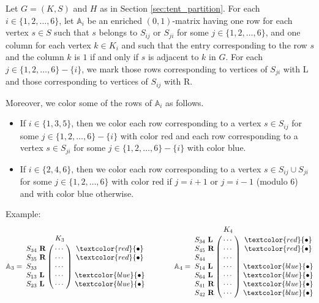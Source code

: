 \documentclass[12pt]{book}
\theoremstyle{plain}
\theoremstyle{remark}
\begin{document}
Let $G=(K,S)$ and $H$ as in Section \ref{sec:tent_partition}. 
For each $i\in\{1,2,\ldots,6\}$, let $\mathbb A_i$ be an enriched $(0,1)$-matrix having one row for each vertex $s\in S$ such that $s$ belongs to $S_{ij}$ or $S_{ji}$ for some $j\in\{1,2,\ldots,6\}$, and one column for each vertex $k\in K_i$ and such that the entry corresponding to the row $s$ and the column $k$ is $1$ if and only if $s$ is adjacent to $k$ in $G$. For each $j\in\{1,2,\ldots,6\}-\{i\}$, we mark those rows corresponding to vertices of $S_{ji}$ with L and those corresponding to vertices of $S_{ij}$ with R.

Moreover, we color some of the rows of $\mathbb A_i$ as follows.
\begin{itemize}
 \item If $i\in\{1,3,5\}$, then we color each row corresponding to a vertex $s\in S_{ij}$ for some $j\in\{1,2,\ldots,6\}-\{i\}$ with color red and each row corresponding to a vertex $s\in S_{ji}$ for some $j\in\{1,2,\ldots,6\}-\{i\}$ with color blue.
 \item If $i\in\{2,4,6\}$, then we color each row corresponding to a vertex $s\in S_{ij}\cup S_{ji}$ for some $j\in\{1,2,\ldots,6\}$ with color red if $j=i+1$ or $j=i-1$ (modulo $6$) and with color blue otherwise.
\end{itemize}

Example:
\[ \mathbb A_3 = \bordermatrix{ & K_3\cr
		S_{34}\ \textbf{R} & \cdots \cr
                S_{35}\ \textbf{R} & \cdots \cr
                S_{33}\            & \cdots \cr
                S_{13}\ \textbf{L} & \cdots \cr
                S_{23}\ \textbf{L} & \cdots}\
                \begin{matrix}
                \textcolor{red}{\bullet} \\ \textcolor{red}{\bullet} \\ \\ \textcolor{blue}{\bullet} \\ \textcolor{blue}{\bullet}
                \end{matrix} \qquad\qquad
   \mathbb A_4 = \bordermatrix{ & K_4\cr
		S_{34}\ \textbf{L} & \cdots \cr
                S_{45}\ \textbf{R} & \cdots\cr
                S_{44}\            & \cdots \cr
                S_{14}\ \textbf{L} & \cdots \cr
                S_{64}\ \textbf{L} & \cdots \cr
                S_{41}\ \textbf{R} & \cdots \cr
                S_{42}\ \textbf{R} & \cdots }\ 
                \begin{matrix}
                \textcolor{red}{\bullet} \\ \textcolor{red}{\bullet} \\ \\ \textcolor{blue}{\bullet} \\ \textcolor{blue}{\bullet} \\ \textcolor{blue}{\bullet} \\ \textcolor{blue}{\bullet}
                \end{matrix} \]
\end{document}
